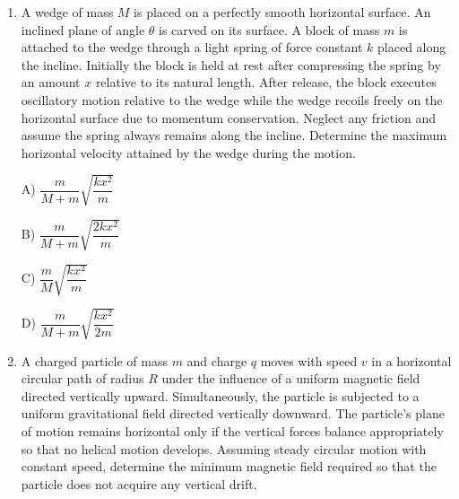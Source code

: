 \documentclass[12pt]{article}
\begin{document}
\begin{enumerate}

\item
A wedge of mass $M$ is placed on a perfectly smooth horizontal surface. 
An inclined plane of angle $\theta$ is carved on its surface. A block of mass $m$ is attached to the wedge through a light spring of force constant $k$ placed along the incline. 
Initially the block is held at rest after compressing the spring by an amount $x$ relative to its natural length. 
After release, the block executes oscillatory motion relative to the wedge while the wedge recoils freely on the horizontal surface due to momentum conservation. 
Neglect any friction and assume the spring always remains along the incline. Determine the maximum horizontal velocity attained by the wedge during the motion.

\begin{center}
\end{center}


A) $\dfrac{m}{M+m}\sqrt{\dfrac{kx^2}{m}}$

B) $\dfrac{m}{M+m}\sqrt{\dfrac{2kx^2}{m}}$

C) $\dfrac{m}{M}\sqrt{\dfrac{kx^2}{m}}$

D) $\dfrac{m}{M+m}\sqrt{\dfrac{kx^2}{2m}}$

\item

A charged particle of mass $m$ and charge $q$ moves with speed $v$ in a horizontal circular path of radius $R$ under the influence of a uniform magnetic field directed vertically upward. 
Simultaneously, the particle is subjected to a uniform gravitational field directed vertically downward. 
The particle’s plane of motion remains horizontal only if the vertical forces balance appropriately so that no helical motion develops. 
Assuming steady circular motion with constant speed, determine the minimum magnetic field required so that the particle does not acquire any vertical drift.


\end{enumerate}
\end{document}
